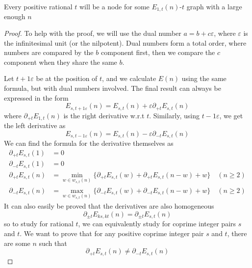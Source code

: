 \documentclass[]{article}
\begin{document}
\vspace{1cm}
\begin{lemma}[Node] 
	Every positive rational $t$ will be a node for some $E_{1,t}(n)$-$t$ graph with a large enough $n$
\end{lemma}
\begin{proof}
	To help with the proof, we will use the dual number $a = b + c\varepsilon $, where $\varepsilon$ is the infinitesimal unit (or the nilpotent). Dual numbers form a total order, where numbers are compared by the $b$ component first, then we compare the $c$ component when they share the same $b$. 
	
	Let $t + 1\varepsilon$ be at the position of $t$, and we calculate $E(n)$ using the same formula, but with dual numbers involved. The final result can always be expressed in the form
	\[
	E_{s,t + 1\varepsilon}(n) = E_{s,t}(n) + \varepsilon \partial_{+t}E_{s,t}(n) 
	\]
	where $\partial_{+t}E_{1,t}(n)  $ is the right derivative w.r.t $t$. Similarly, using $t - 1\varepsilon$, we get the left derivative as 
	\[
	E_{s,t - 1\varepsilon}(n) = E_{s,t}(n) - \varepsilon \partial_{-t}E_{s,t}(n) 
	\]
	We can find the formula for the derivative themselves as
	\begin{align*}
	\partial_{+t}E_{s,t}(1) &= 0\\
	 \partial_{-t}E_{s,t}(1) &= 0 \\
	 \partial_{+t}E_{s,t}(n) &= \min_{w\in w_{s,t}(n)}\{\partial_{+t}E_{s,t}(w) + \partial_{+t}E_{s,t}(n-w) + w\} \quad(n\geq 2)\\
	 \partial_{-t}E_{s,t}(n) &= \max_{w\in w_{s,t}(n)}\{\partial_{-t}E_{s,t}(w) + \partial_{-t}E_{s		,t}(n-w) + w\} \quad(n\geq 2)
	\end{align*}
	It can also easily be proved that the derivatives are also homogeneous
	\[
	\partial_{\pm t}E_{ks,kt}(n) = \partial_{\pm t}E_{s,t}(n)
	\]
	so to study for rational $t$, we can equivalently study for coprime integer pairs $s$ and $t$. We want to prove that for any positive coprime integer pair $s$ and $t$, there are some $n$ such that
	\[
	\partial_{+t}E_{s,t}(n) \neq \partial_{-t}E_{s,t}(n) 
	\]
	

\end{proof}
\end{document}

